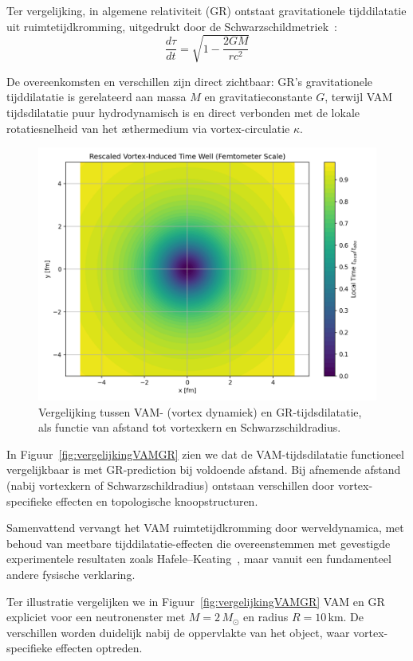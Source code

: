 Ter vergelijking, in algemene relativiteit (GR) ontstaat gravitationele tijddilatatie uit ruimtetijdkromming, uitgedrukt door de Schwarzschildmetriek~\cite{schutz2009first}:
\begin{equation}\label{eq:GRtijd}
    \frac{d\tau}{dt} = \sqrt{1 - \frac{2GM}{rc^2}}
\end{equation}

De overeenkomsten en verschillen zijn direct zichtbaar: GR's gravitationele tijddilatatie is gerelateerd aan massa $M$ en gravitatieconstante $G$, terwijl VAM tijdsdilatatie puur hydrodynamisch is en direct verbonden met de lokale rotatiesnelheid van het æthermedium via vortex-circulatie $\kappa$.

\begin{figure}[ht!]
    \centering
    \includegraphics[width=0.7\linewidth]{RadialProfileOfLocalTimeDilation_Vortex-Induced_Time_Well}
    \caption{Vergelijking tussen VAM- (vortex dynamiek) en GR-tijdsdilatatie, als functie van afstand tot vortexkern en Schwarzschildradius.}
    \label{fig:vergelijking_VAMGR}
\end{figure}

In Figuur~\ref{fig:vergelijkingVAMGR} zien we dat de VAM-tijdsdilatatie functioneel vergelijkbaar is met GR-prediction bij voldoende afstand. Bij afnemende afstand (nabij vortexkern of Schwarzschildradius) ontstaan verschillen door vortex-specifieke effecten en topologische knoopstructuren.

Samenvattend vervangt het VAM ruimtetijdkromming door werveldynamica, met behoud van meetbare tijddilatatie-effecten die overeenstemmen met gevestigde experimentele resultaten zoals Hafele–Keating~\cite{hafele1972around}, maar vanuit een fundamenteel andere fysische verklaring.


Ter illustratie vergelijken we in Figuur~\ref{fig:vergelijkingVAMGR} VAM en GR expliciet voor een neutronenster met $M = 2\,M_\odot$ en radius $R = 10\,\text{km}$. De verschillen worden duidelijk nabij de oppervlakte van het object, waar vortex-specifieke effecten optreden.

